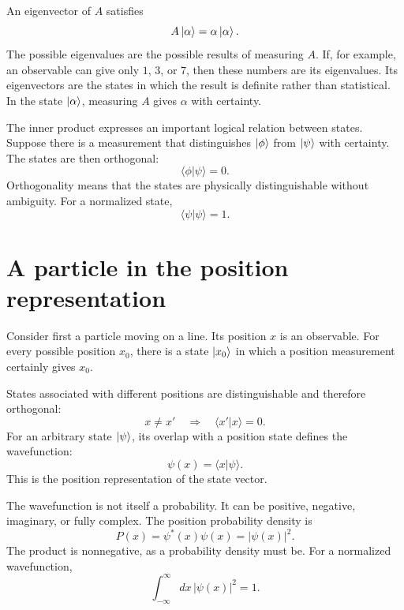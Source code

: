An eigenvector of \(A\) satisfies
\begin{equation}
A\left\lvert\alpha\right\rangle=\alpha\left\lvert\alpha\right\rangle.
\end{equation}
The possible eigenvalues are the possible results of measuring \(A\). If, for example, an observable can give only \(1\), \(3\), or \(7\), then these numbers are its eigenvalues. Its eigenvectors are the states in which the result is definite rather than statistical. In the state \(\left\lvert\alpha\right\rangle\), measuring \(A\) gives \(\alpha\) with certainty.

The inner product expresses an important logical relation between states. Suppose there is a measurement that distinguishes \(\left\lvert\phi\right\rangle\) from \(\left\lvert\psi\right\rangle\) with certainty. The states are then orthogonal:
\begin{equation}
\langle\phi|\psi\rangle=0.
\end{equation}
Orthogonality means that the states are physically distinguishable without ambiguity. For a normalized state,
\begin{equation}
\langle\psi|\psi\rangle=1.
\end{equation}

\section{A particle in the position representation}

Consider first a particle moving on a line. Its position \(x\) is an observable. For every possible position \(x_0\), there is a state \(\left\lvert x_0\right\rangle\) in which a position measurement certainly gives \(x_0\).

States associated with different positions are distinguishable and therefore orthogonal:
\begin{equation}
x\neq x'
\quad\Longrightarrow\quad
\langle x'|x\rangle=0.
\end{equation}
For an arbitrary state \(\left\lvert\psi\right\rangle\), its overlap with a position state defines the wavefunction:
\begin{equation}
\psi(x)=\langle x|\psi\rangle.
\end{equation}
This is the position representation of the state vector.

The wavefunction is not itself a probability. It can be positive, negative, imaginary, or fully complex. The position probability density is
\begin{equation}
P(x)=\psi^*(x)\psi(x)=|\psi(x)|^2.
\end{equation}
The product is nonnegative, as a probability density must be. For a normalized wavefunction,
\begin{equation}
\int_{-\infty}^{\infty}dx\,|\psi(x)|^2=1.
\end{equation}

